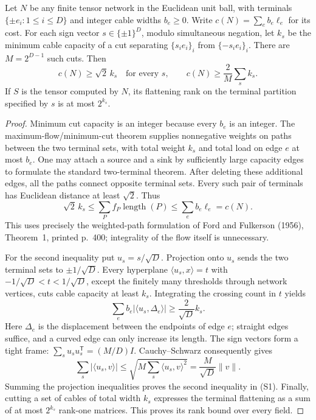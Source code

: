 \begin{lemma}
\label{lem:sign-cut-cost}
Let $N$ be any finite tensor network in the Euclidean unit ball,
with terminals $\{\pm e_i:1\le i\le D\}$ and integer cable
widths $b_e\ge0$.  Write $c(N)=\sum_e b_e\ell_e$ for its cost.
For each sign vector $s\in\{\pm1\}^D$, modulo simultaneous
negation, let $k_s$ be the minimum cable capacity of a cut
separating $\{s_i e_i\}_i$ from $\{-s_i e_i\}_i$.
There are $M=2^{D-1}$ such cuts.  Then
\[
 c(N)\ge\sqrt2\,k_s\quad\text{for every }s,
 \qquad
 c(N)\ge\frac2M\sum_s k_s.                         \tag{S1}
\]
If $S$ is the tensor computed by $N$, its flattening rank on
the terminal partition specified by $s$ is at most $2^{k_s}$.
\end{lemma}
\begin{proof}
Minimum cut capacity is an integer because every $b_e$ is an
integer.  The maximum-flow/minimum-cut theorem supplies
nonnegative weights on paths between the two terminal sets,
with total weight $k_s$ and total load on edge $e$ at most $b_e$.
One may attach a source and a sink by sufficiently large
capacity edges to formulate the standard two-terminal theorem.
After deleting these additional edges, all the paths connect
opposite terminal sets.  Every such pair of terminals has
Euclidean distance at least $\sqrt2$.  Thus
\[
 \sqrt2\,k_s
 \le\sum_P f_P\operatorname{length}(P)
 \le\sum_e b_e\ell_e=c(N).
\]
This uses precisely the weighted-path formulation of
Ford and Fulkerson (1956), Theorem~1, printed p.~400;
integrality of the flow itself is unnecessary.

For the second inequality put $u_s=s/\sqrt D$.  Projection
onto $u_s$ sends the two terminal sets to $\pm1/\sqrt D$.
Every hyperplane $\langle u_s,x\rangle=t$ with
$-1/\sqrt D<t<1/\sqrt D$, except the finitely many thresholds
through network vertices, cuts cable capacity at least $k_s$.
Integrating the crossing count in $t$ yields
\[
 \sum_e b_e|\langle u_s,\Delta_e\rangle|
 \ge\frac2{\sqrt D}k_s.
\]
Here $\Delta_e$ is the displacement between the endpoints of
edge $e$; straight edges suffice, and a curved edge can only
increase its length.  The sign vectors form a tight frame:
$\sum_s u_su_s^{\mathsf T}=(M/D)I$.
Cauchy--Schwarz consequently gives
\[
 \sum_s|\langle u_s,v\rangle|
 \le\sqrt{M\sum_s\langle u_s,v\rangle^2}
 =\frac M{\sqrt D}\|v\|.
\]
Summing the projection inequalities proves the second
inequality in (S1).  Finally, cutting a set of cables of total
width $k_s$ expresses the terminal flattening as a sum of at
most $2^{k_s}$ rank-one matrices.  This proves its rank bound
over every field.
\end{proof}

